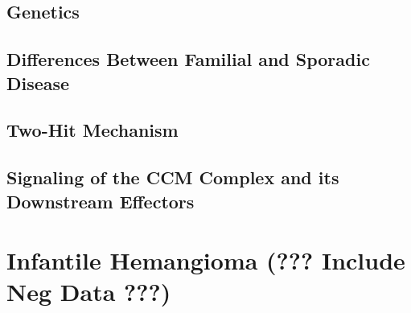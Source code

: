 \subsection{Genetics}
\subsection{Differences Between Familial and Sporadic Disease}
\subsection{Two-Hit Mechanism}
\subsection{Signaling of the CCM Complex and its Downstream Effectors}

\section{Infantile Hemangioma (??? Include Neg Data ???)}